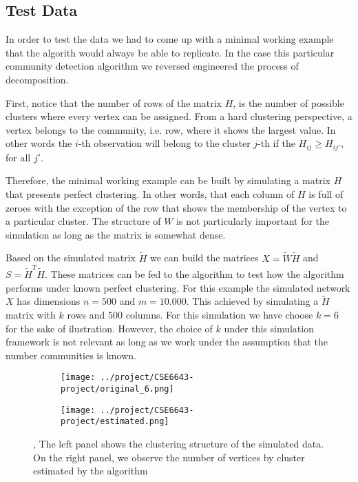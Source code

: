 \documentclass[11pt,letter]{article}%
\numberwithin{equation}{section}
\begin{document}
\subsection{Test  Data}

In order to test the data we had to come up with a minimal working example that the algorith would always be able to replicate. In the case this particular  community detection algorithm we reversed engineered the process of decomposition. 

First, notice that the number of rows of the matrix $H$, is the number of possible clusters where every vertex can be assigned. From a hard clustering perspective, a vertex belongs to the community, i.e. row, where it shows the largest value. In other words the $i$-th observation will belong to the cluster $j$-th if the $H_{ij}\geq H_{ij'}$, for all $j'$. 

Therefore, the minimal working example can be built by simulating a matrix $H$ that presents perfect clustering. In other words, that each column of  $H$ is full of zeroes with the exception of the row that shows the membership of the vertex to a particular cluster. The structure of $W$ is not particularly important for the simulation as long as the matrix is somewhat dense. 

Based on the simulated matrix $\widetilde{H}$ we can build the matrices $X=\widetilde{W}\widetilde{H}$ and  $S=\widetilde{H}^T\widetilde{H}$. These matrices can be fed to the algorithm to test how the algorithm performs under known perfect clustering. For this example the simulated network $X$ has dimensions $n=500$ and $m=10.000$. This achieved by simulating a $\widetilde{H}$ matrix with $k$ rows and $500$ columns.  For this simulation we have choose $k=6$ for the sake of ilustration. However, the choice of $k$ under this simulation framework is not relevant as long as we work under the assumption that the number communities is known. 



\begin{figure}[!h]
    \centering
    \begin{subfigure}[b]{0.45\textwidth}
            \centering
            \texttt{[image: ../project/CSE6643-project/original\_6.png]}
    \label{fig:fig1}
    \end{subfigure}
\begin{subfigure}[b]{0.45\textwidth}
            \centering
            \texttt{[image: ../project/CSE6643-project/estimated.png]}
    \label{fig:fig2}
    \end{subfigure}
    \caption{\protect{}, The left panel  shows the clustering structure of the simulated data. On the  right panel, \protect{} we observe the number of vertices by cluster estimated by the algorithm}
\end{figure}
\end{document}
